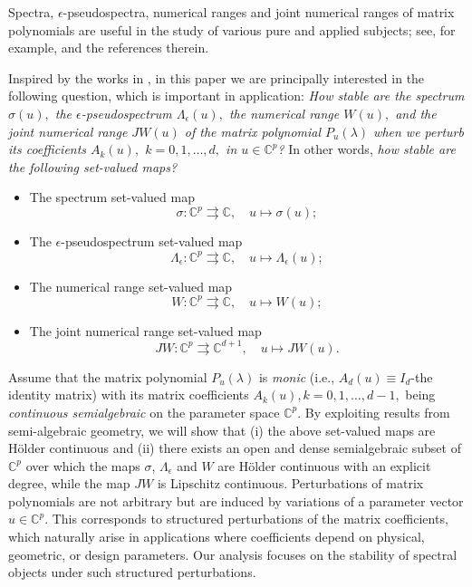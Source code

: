 \documentclass[10pt,reqno]{amsart}
\theoremstyle{break-italic}
\theoremstyle{break-italic}
\theoremstyle{break-italic}
\theoremstyle{break-italic}
\theoremstyle{break-italic}
\theoremstyle{break-italic}
\theoremstyle{break-italic}
\theoremstyle{break-italic}
\theoremstyle{break-roman}
\theoremstyle{standard}
\theoremstyle{varthm-roman}
\theoremstyle{varthm-italic}
\theoremstyle{varthm-roman-break}
\theoremstyle{varthm-italic-break}
\theoremstyle{varthm-roman-no-punctuation}
\theoremstyle{varthm-italic-no-punctuation}
\numberwithin{equation}{section}
\begin{document}
 Spectra, $\epsilon$-pseudospectra, numerical ranges and joint numerical ranges of matrix polynomials are useful in the study of various pure and applied subjects; see, for example, \cite{Armentia2017, Binding1991, Boulton2008, Doyle1982, Duffin1955, Fan1988, Gau2011, Gohberg1982, Gustafson1997, Gutkin2004, Higham2002, Higham2003, Horn2013, Jonckheere1998, Lancaster1966, Lancaster2001, Lancaster2003, Lancaster2005, Li1994, Li1999, Li2009, Maroulas1997, Mosier1986, Poon1997, Psarrakos2000, Tisseur2001-1, Tisseur2001-2, Trefethen1992, Trefethen1999-1, Trefethen1999-2, Zeng2014} and the references therein.

Inspired by the works in \cite{Boulton2008, Lancaster2005, Li1994, Tisseur2001-1}, in this paper we are principally interested in the following question, which is important in application: \textit{How stable are the spectrum $\sigma(u),$ the $\epsilon$-pseudospectrum $\Lambda_\epsilon(u),$ the numerical range $W(u),$ and the joint numerical range $JW(u)$ of the matrix polynomial $P_u(\lambda)$ when we perturb its coefficients $A_k(u),$  $ k = 0, 1,\ldots, d, $ in $u\in \mathbb C^p$?}  In other words, \textit{how stable are the following  set-valued maps?}
\begin{itemize}
\item The spectrum set-valued map
$$\sigma \colon \mathbb{C}^p \rightrightarrows \mathbb{C}, \quad u \mapsto \sigma(u);$$

\item  The  $\epsilon$-pseudospectrum set-valued map
$$\Lambda_\epsilon  \colon \mathbb{C}^p \rightrightarrows \mathbb{C}, \quad u \mapsto \Lambda_\epsilon(u);$$

\item  The numerical range set-valued map
 $$W \colon \mathbb{C}^p \rightrightarrows \mathbb{C}, \quad u \mapsto W(u);$$

\item  The joint numerical range set-valued map
$$JW \colon \mathbb{C}^p \rightrightarrows \mathbb{C}^{d + 1}, \quad u \mapsto JW(u).$$
\end{itemize}

Assume that the matrix polynomial $P_u(\lambda)$ is {\em monic} (i.e., $A_{d}(u) \equiv I_d$-the identity matrix) with  its matrix coefficients $A_{k}(u), k = 0, 1, \ldots, d - 1, $ being \emph{continuous semialgebraic} on the parameter space $\mathbb C^p.$ By exploiting results from semi-algebraic geometry, we will show  that (i) the above set-valued  maps are H\"older continuous and (ii) there exists an open and dense semialgebraic subset of $\mathbb C^p$ over which the maps $\sigma$, $\Lambda_\epsilon$ and $W$ are H\"older continuous  with an explicit degree, while the map $JW$ is Lipschitz continuous. Perturbations of matrix polynomials are not arbitrary but are induced by  variations of a parameter vector $u \in \mathbb{C}^p$. This corresponds to structured perturbations of the matrix coefficients, which naturally arise in applications where coefficients depend on physical, geometric, or design parameters. Our analysis focuses on the stability of spectral objects under such structured perturbations. 
\end{document}
